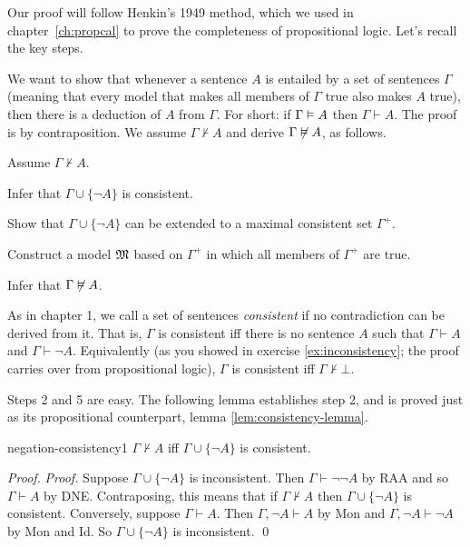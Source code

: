 \fi


Our proof will follow Henkin's 1949 method,
which we used in chapter~\ref{ch:propcal} to prove
the completeness of propositional logic.
Let's recall the key steps.

We want to show that
whenever a sentence $A$ is entailed by a set of sentences $\Gamma$
(meaning that every model that makes all members of $\Gamma$ true also makes $A$ true),
then there is a deduction of $A$ from $\Gamma$.
For short:
if $\Gamma \vDash A$ then $\Gamma \vdash A$.
The proof is by contraposition.
We assume $\Gamma \not\vdash A$ and derive $\Gamma \not\vDash A$,
as follows.

\begin{cenumerate}
\item Assume $\Gamma \not\vdash A$.
\item Infer that $\Gamma \cup \{ \neg A \}$ is consistent.
\item Show that $\Gamma \cup \{ \neg A \}$ can be extended to a maximal consistent set $\Gamma^{+}$.
\item Construct a model $\mathfrak{M}$ based on $\Gamma^{+}$ in which all members of $\Gamma^{+}$ are true.
\item Infer that $\Gamma \not\vDash A$.
\end{cenumerate}
%
%
As in chapter 1,
we call a set of sentences \emph{consistent}
if no contradiction can be derived from it.
That is,
$\Gamma$ is consistent iff
there is no sentence $A$ such that $\Gamma \vdash A$ and $\Gamma \vdash \neg A$.
Equivalently
(as you showed in exercise \ref{ex:inconsistency};
the proof carries over from propositional logic),
$\Gamma$ is consistent iff
$\Gamma \not\vdash \bot$.

Steps 2 and 5 are easy.
The following lemma establishes step 2,
and is proved just as its propositional counterpart,
lemma \ref{lem:consistency-lemma}.

\begin{lemma}{}{negation-consistency1}
  $\Gamma \not\vdash A$ iff $\Gamma \cup \{\neg A\}$ is consistent.
\end{lemma}
\begin{proof}
  \emph{Proof.}
  Suppose $\Gamma \cup \{\neg A\}$ is inconsistent.
  Then $\Gamma \vdash \neg \neg A$ by RAA
  and so $\Gamma \vdash A$ by DNE.
  Contraposing,
  this means that if $\Gamma \not\vdash A$ then $\Gamma \cup \{ \neg A \}$ is consistent.
  Conversely,
  suppose $\Gamma \vdash A$.
  Then $\Gamma, \neg A \vdash A$ by Mon
  and $\Gamma, \neg A \vdash \neg A$ by Mon and Id.
  So $\Gamma \cup \{ \neg A \}$ is inconsistent. \qed
\end{proof}


